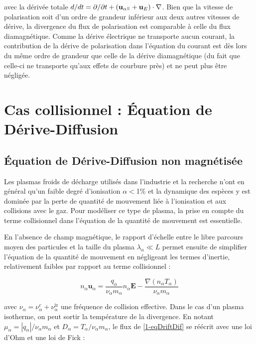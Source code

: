 \begin{refsection}
avec la dérivée totale $d/dt=\partial/\partial t + (\mathbf
u_{\alpha\para}+\mathbf u_{E})\cdot\nabla$. Bien que la vitesse de
polarisation soit d'un ordre de grandeur inférieur aux deux autres vitesses de dérive, la divergence du flux 
de polarisation est comparable à celle du flux diamagnétique. Comme
la dérive électrique ne transporte aucun courant, la
contribution de la dérive de polarisation dans
l'équation du courant est dès lors du même ordre de
grandeur que celle de la dérive diamagnétique (du fait que celle-ci ne
transporte qu'aux effets de courbure près) et ne peut plus être négligée.

\section{Cas collisionnel : Équation de Dérive-Diffusion}
\label{1-transportAmbipolaire}
\subsection{Équation de Dérive-Diffusion non magnétisée}
Les plasmas froids de décharge utilisés dans l'industrie et la recherche n'ont
en général qu'un faible degré d'ionisation $\alpha<$1\% et la dynamique des
espèces y est dominée par la perte de quantité de mouvement liée à l'ionisation
et aux collisions avec le gaz. Pour modéliser ce type de plasma, la prise en
compte du terme collisionnel dans l'équation de la quantité de mouvement est
essentielle. 


En l'absence de champ magnétique, le rapport d'échelle entre le libre parcours moyen des particules
et la taille du plasma $\lambda_\alpha\ll L$ permet ensuite de simplifier
l'équation de la quantité de mouvement en négligeant les termes d'inertie, relativement
faibles par rapport au terme collisionnel :

\begin{equation}
\label{1-eqDriftDif}
n_\alpha\mathbf u_\alpha=\frac{q_\alpha}{\nu_\alpha m_\alpha}n_\alpha\mathbf
E-\frac{\nabla\left(n_\alpha T_\alpha\right)}{\nu_\alpha
m_\alpha}
\end{equation}

avec $\nu_\alpha=\nu_\alpha^c+\nu_\alpha^\text{iz}$ une fréquence de collision
effective. Dans le cas d'un plasma isotherme, on peut sortir la température de
la divergence.
En notant $\mu_\alpha=|q_\alpha|/\nu_\alpha m_\alpha$ et
$D_\alpha=T_\alpha/\nu_\alpha m_\alpha$, le flux de \eqref{1-eqDriftDif} se
réécrit avec une loi d'Ohm et une loi de Fick :


\end{refsection}
